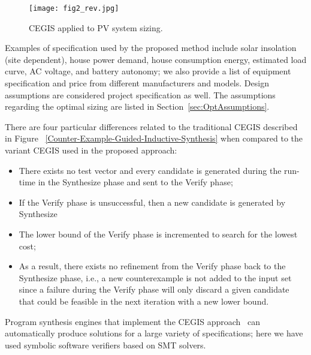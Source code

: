\begin{figure}[h]
	\centering
	\texttt{[image: fig2\_rev.jpg]}
	\caption{CEGIS applied to PV system sizing.}
	\label{CEGISalt}
\end{figure}

Examples of specification used by the proposed method include solar insolation (site dependent), house power demand, house consumption energy, estimated load curve, AC voltage, and battery autonomy; we also provide a list of equipment specification and price from different manufacturers and models. Design assumptions are considered project specification as well. The assumptions regarding the optimal sizing are listed in Section~\ref{sec:OptAssumptions}.

There are four particular differences related to the traditional CEGIS described in Figure ~\ref{Counter-Example-Guided-Inductive-Synthesis} when compared to the variant CEGIS used in the proposed approach: 

\begin{itemize}
\item There exists no test vector and every candidate is generated during the run-time in the {\sc Synthesize} phase and sent to the {\sc Verify} phase; 
\item If the {\sc Verify} phase is unsuccessful, then a new candidate is generated by {\sc Synthesize} 
\item The lower bound of the {\sc Verify} phase is incremented to search for the lowest cost; 
\item As a result, there exists no refinement from the {\sc Verify} phase back to the {\sc Synthesize} phase, i.e., a new counterexample is not added to the {\sc input} set since a failure during the {\sc Verify} phase will only discard a given candidate that could be feasible in the next iteration with a new lower bound.
\end{itemize}

Program synthesis engines that implement the CEGIS approach~\cite{sketch} can automatically produce solutions for a large variety of specifications; here we have used symbolic software verifiers based on SMT solvers.

